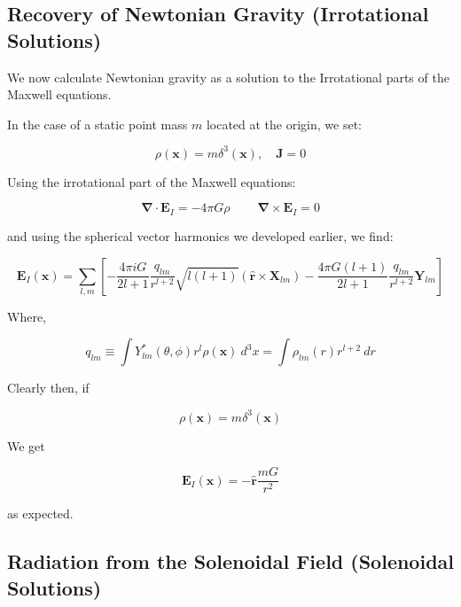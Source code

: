 \documentclass {article}
\renewcommand\vec{\mathbf}
\let\OldS\nabla
\renewcommand{\nabla}{\boldsymbol{\OldS}}
\let\OldHat\hat
\renewcommand{\hat}[1]{\OldHat{\mathbf{#1}}}
\begin{document}
\subsection{Recovery of Newtonian Gravity (Irrotational Solutions)}

We now calculate Newtonian gravity as a solution to the Irrotational parts of the Maxwell equations.

In the case of a static point mass \( m \) located at the origin, we set:

\begin{equation}
\rho(\vec{x}) = m \delta^3(\vec{x}), \quad \vec{J} = 0
\end{equation}


Using the irrotational part of the Maxwell equations:


\begin{equation}
\nabla \cdot \vec{E}_I = -4 \pi G \rho ~~~~~~~~~~ \nabla \times \vec{E}_I = 0
\end{equation}

and using the spherical vector harmonics we developed earlier,  we find:


\begin{equation}
\vec E_I(\vec x) = \sum_{l,m} \left[ -\frac {4\pi i G }{2l+1} \frac {q_{lm}}{r^{l+2}} \sqrt {l(l+1)} \left(\hat r \times \vec X_{lm} \right)  - \frac {4 \pi G (l+1)}{2l+1} \frac {q_{lm}}{r^{l+2}} \vec Y_{lm} \right] 
\end{equation}

Where,

\begin{equation}
q_{lm} \equiv \int Y_{lm}^* (\theta, \phi) r^l  \rho (\vec x) ~ d^3x = \int \rho_{lm} (r) r^{l+2} ~ dr 
\end{equation}

Clearly then, if

\begin{equation}
\rho(\vec{x}) = m \delta^3(\vec{x})
\end{equation}


We get

\begin{equation}
\vec E_I(\vec x) = - \hat{r}\frac {mG} {r^2}
\end{equation}

as expected.



\subsection{Radiation from the Solenoidal Field (Solenoidal Solutions)}
\end{document}
